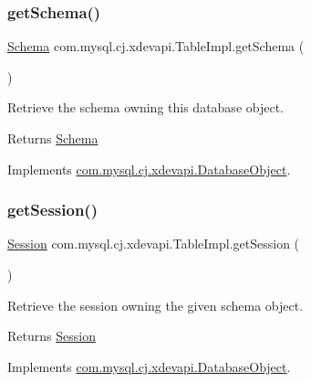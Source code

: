 \subsubsection{\texorpdfstring{get\+Schema()}{getSchema()}}
{\footnotesize\ttfamily \mbox{\hyperlink{interfacecom_1_1mysql_1_1cj_1_1xdevapi_1_1_schema}{Schema}} com.\+mysql.\+cj.\+xdevapi.\+Table\+Impl.\+get\+Schema (\begin{DoxyParamCaption}{ }\end{DoxyParamCaption})}

Retrieve the schema owning this database object.

\begin{DoxyReturn}{Returns}
\mbox{\hyperlink{interfacecom_1_1mysql_1_1cj_1_1xdevapi_1_1_schema}{Schema}} 
\end{DoxyReturn}


Implements \mbox{\hyperlink{interfacecom_1_1mysql_1_1cj_1_1xdevapi_1_1_database_object_a2d3d1b87950c42ecbe557248c51c954b}{com.\+mysql.\+cj.\+xdevapi.\+Database\+Object}}.

\mbox{\label{classcom_1_1mysql_1_1cj_1_1xdevapi_1_1_table_impl_a50a4a5d8827aef7156fe6aa564f8809a}} 
\subsubsection{\texorpdfstring{get\+Session()}{getSession()}}
{\footnotesize\ttfamily \mbox{\hyperlink{interfacecom_1_1mysql_1_1cj_1_1xdevapi_1_1_session}{Session}} com.\+mysql.\+cj.\+xdevapi.\+Table\+Impl.\+get\+Session (\begin{DoxyParamCaption}{ }\end{DoxyParamCaption})}

Retrieve the session owning the given schema object.

\begin{DoxyReturn}{Returns}
\mbox{\hyperlink{interfacecom_1_1mysql_1_1cj_1_1xdevapi_1_1_session}{Session}} 
\end{DoxyReturn}


Implements \mbox{\hyperlink{interfacecom_1_1mysql_1_1cj_1_1xdevapi_1_1_database_object_a0bebc7132108a9cfcffed4a599b2dad5}{com.\+mysql.\+cj.\+xdevapi.\+Database\+Object}}.

